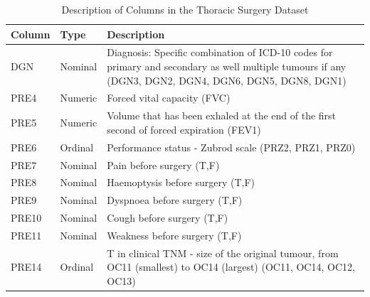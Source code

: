 \documentclass[journal]{IEEEtran}
\begin{document}
\begin{table}[]
\centering
\caption{Description of Columns in the Thoracic Surgery Dataset}
\label{table:dataset-columns}
\begin{tabular}{|l|l|p{6cm}|}
\hline
\textbf{Column} & \textbf{Type} & \textbf{Description}                                                                                                                           \\ \hline
DGN             & Nominal       & Diagnosis: Specific combination of ICD-10 codes for primary and secondary as well multiple tumours if any (DGN3, DGN2, DGN4, DGN6, DGN5, DGN8, DGN1) \\ \hline
PRE4            & Numeric       & Forced vital capacity (FVC)                                                                                                                    \\ \hline
PRE5            & Numeric       & Volume that has been exhaled at the end of the first second of forced expiration (FEV1)                                                        \\ \hline
PRE6            & Ordinal       & Performance status - Zubrod scale (PRZ2, PRZ1, PRZ0)                                                                                             \\ \hline
PRE7            & Nominal       & Pain before surgery (T,F)                                                                                                                      \\ \hline
PRE8            & Nominal       & Haemoptysis before surgery (T,F)                                                                                                               \\ \hline
PRE9            & Nominal       & Dyspnoea before surgery (T,F)                                                                                                                  \\ \hline
PRE10           & Nominal       & Cough before surgery (T,F)                                                                                                                     \\ \hline
PRE11           & Nominal       & Weakness before surgery (T,F)                                                                                                                  \\ \hline
PRE14           & Ordinal       & T in clinical TNM - size of the original tumour, from OC11 (smallest) to OC14 (largest) (OC11, OC14, OC12, OC13)                                  \\ \hline

\end{tabular}
\end{table}
\end{document}
